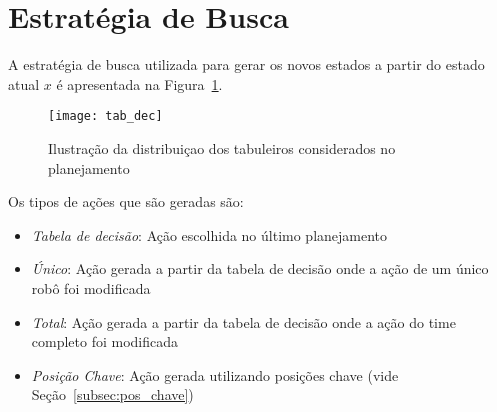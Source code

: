 \section{Estratégia de Busca}\label{sec:est_busca}
A estratégia de busca utilizada para gerar os novos
estados a partir do estado atual $x$ é apresentada na
Figura~\ref{fig:estr_busca}.

\begin{figure}[H]
  \centering
  \texttt{[image: tab\_dec]}
  \caption{Ilustração da distribuiçao dos tabuleiros
           considerados no planejamento}\label{fig:estr_busca}
\end{figure}

Os tipos de ações que são geradas são:
\begin{itemize}
  \item \textit{Tabela de decisão}: Ação escolhida no último planejamento
  \item \textit{Único}: Ação gerada a partir da tabela de decisão
        onde a ação de um único robô foi modificada
  \item \textit{Total}: Ação gerada a partir da tabela de decisão
        onde a ação do time completo foi modificada
  \item \textit{Posição Chave}: Ação gerada utilizando posições chave
        (vide Seção~\ref{subsec:pos_chave})
\end{itemize}




